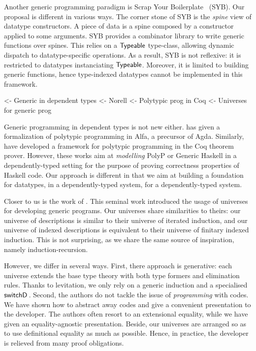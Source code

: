 Another generic programming paradigm is Scrap Your
Boilerplate~\cite{spj:syb} (SYB). Our proposal is different in various
ways. The corner stone of SYB is the \emph{spine} view of datatype
constructors. A piece of data is a spine composed by a constructor
applied to some arguments. SYB provides a combinator library to write
generic functions over spines. This relies on a $\textsf{Typeable}$
type-class, allowing dynamic dispatch to datatype-specific
operations. As a result, SYB is not reflexive: it is restricted to
datatypes instanciating $\textsf{Typeable}$. Moreover, it is limited to
building generic functions, hence type-indexed datatypes cannot be
implemented in this framework.


\begin{wstructure}
    <- Generic in dependent types
        <- Norell \cite{norell:msc-thesis}
        <- Polytypic prog in Coq \cite{verbruggen:polytype-coq}
        <- Universes for generic prog \cite{benke:universe-generic-prog}
\end{wstructure}

Generic programming in dependent types is not new
either. \citet{norell:msc-thesis} has given a formalization of
polytypic programming in Alfa, a precursor of Agda. Similarly,
\citet{verbruggen:polytype-prog-coq, verbruggen:polytype-coq} have
developed a framework for polytypic programming in the Coq theorem
prover. However, these works aim at \emph{modelling} PolyP or Generic
Haskell in a dependently-typed setting for the purpose of proving
correctness properties of Haskell code. Our approach is different in
that we aim at building a foundation for datatypes, in a
dependently-typed system, for a dependently-typed system.

Closer to us is the work of \citet{benke:universe-generic-prog}. This
seminal work introduced the usage of universes for developing generic
programs. Our universes share similarities to theirs: our universe of
descriptions is similar to their universe of iterated induction, and
our universe of indexed descriptions is equivalent to their universe
of finitary indexed induction. This is not surprising, as we share the
same source of inspiration, namely induction-recursion.

However, we differ in several ways. First, there approach is
generative: each universe extends the base type theory with both type
formers and elimination rules. Thanks to levitation, we only rely on a
generic induction and a specialised $\switchD{\!}{\!}{\!}$. Second,
the authors do not tackle the issue of \emph{programming} with
codes. We have shown how to abstract away codes and give a convenient
presentation to the developer. The authors often resort to an
extensional equality, while we have given an equality-agnostic
presentation. Beside, our universes are arranged so as to use
definitional equality as much as possible. Hence, in practice, the
developer is relieved from many proof obligations.
